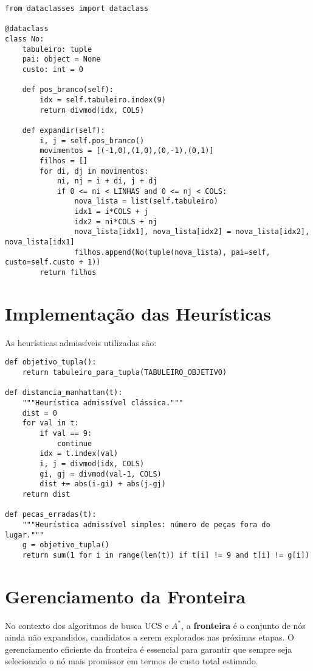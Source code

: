 \begin{verbatim}  
from dataclasses import dataclass  

@dataclass  
class No:  
    tabuleiro: tuple  
    pai: object = None  
    custo: int = 0  

    def pos_branco(self):  
        idx = self.tabuleiro.index(9)  
        return divmod(idx, COLS)  

    def expandir(self):  
        i, j = self.pos_branco()  
        movimentos = [(-1,0),(1,0),(0,-1),(0,1)]  
        filhos = []  
        for di, dj in movimentos:  
            ni, nj = i + di, j + dj  
            if 0 <= ni < LINHAS and 0 <= nj < COLS:  
                nova_lista = list(self.tabuleiro)  
                idx1 = i*COLS + j  
                idx2 = ni*COLS + nj  
                nova_lista[idx1], nova_lista[idx2] = nova_lista[idx2], nova_lista[idx1]  
                filhos.append(No(tuple(nova_lista), pai=self, custo=self.custo + 1))  
        return filhos  
\end{verbatim}  

\section{Implementação das Heurísticas}  
As heurísticas admissíveis utilizadas são:  

\begin{verbatim}  
def objetivo_tupla():  
    return tabuleiro_para_tupla(TABULEIRO_OBJETIVO)  

def distancia_manhattan(t):  
    """Heurística admissível clássica."""  
    dist = 0  
    for val in t:  
        if val == 9:  
            continue  
        idx = t.index(val)  
        i, j = divmod(idx, COLS)  
        gi, gj = divmod(val-1, COLS)  
        dist += abs(i-gi) + abs(j-gj)  
    return dist  

def pecas_erradas(t):  
    """Heurística admissível simples: número de peças fora do lugar."""  
    g = objetivo_tupla()  
    return sum(1 for i in range(len(t)) if t[i] != 9 and t[i] != g[i])  
\end{verbatim}  

\section{Gerenciamento da Fronteira}  
No contexto dos algoritmos de busca UCS e $A^*$, a \textbf{fronteira} é o conjunto de nós ainda não expandidos, candidatos a serem explorados nas próximas etapas. O gerenciamento eficiente da fronteira é essencial para garantir que sempre seja selecionado o nó mais promissor em termos de custo total estimado.  

